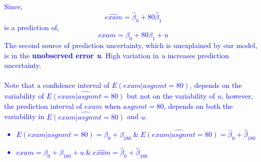 \documentclass[12pt]{report}
\newenvironment{blueframed}[1][blue]
{\def\FrameCommand{\fboxsep=\FrameSep\fcolorbox{#1}{white}}%
	\MakeFramed {\advance\hsize-\width \FrameRestore}}
{\endMakeFramed}
\begin{document}
\begin{blueframed}
	\vspace{-\baselineskip}
	\justify
	\noindent \textcolor{blue}
	{
		Since, $$\widehat{exam} = \hat{\beta}_0 + 80\hat{\beta}_1$$ is a prediction of, $$exam = \beta_0 + 80\beta_1 + u$$
		The second source of prediction uncertainty, which is unexplained by our model, is in the \textbf{unobserved error \textit{u}}. High variation in \textit{u} increases prediction uncertainty. \\ \\ Note that a confidence interval of $E(exam|asgnmt=80)$, depends on the variability of $\widehat{E(exam|asgnmt=80)}$ but not on the variability of $u$, however, the  prediction interval of $exam$ when $asgnmt=80$, depends on both the variability in $\widehat{E(exam|asgnmt=80)}$ and $u$. 
		\begin{itemize}
			\item $E(exam|asgnmt=80) = \beta_0 + \beta_180\ \&\  \widehat{E(exam|asgnmt=80)} = \hat{\beta}_0 + \hat{\beta}_180$ 
			\item $exam = \beta_0 + \beta_180 + u\ \&\ \widehat{exam} = \hat{\beta}_0 + \hat{\beta}_180$
		\end{itemize}
	}
\end{blueframed}
\end{document}
